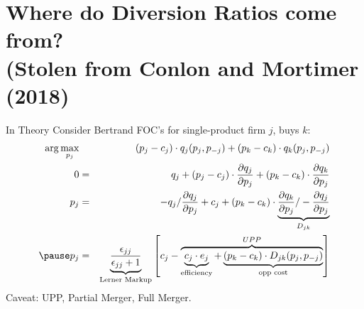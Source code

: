 \documentclass[xcolor=pdftex,dvipsnames,table,mathserif]{beamer}
\begin{document}

\section{Where do Diversion Ratios come from?\\ (Stolen from Conlon and Mortimer (2018)}
\begin{frame}{In Theory}
Consider Bertrand FOC's for single-product firm $j$, buys $k$:
\begin{eqnarray*}
\arg \max_{p_j}&&\, (p_j-c_j) \cdot q_j(p_j,p_{-j}) + (p_k-c_k) \cdot q_k(p_j,p_{-j})\\
0 &=&q_j+ (p_j-c_j) \cdot \frac{\partial q_j}{\partial p_j}+ (p_k-c_k) \cdot  \frac{\partial q_k}{\partial p_j}\\
p_j &=&-q_j/\frac{\partial q_j}{\partial p_j}+ c_j + (p_k-c_k) \cdot  \underbrace{\frac{\partial q_k}{\partial p_j}/-\frac{\partial q_j}{\partial p_j}}_{D_{jk}}\\ \pause
p_j &=& \underbrace{\frac{\epsilon_{jj}}{\epsilon_{jj}+1}}_{\text{Lerner Markup}} \left[  c_j -\overbrace{ \underbrace{c_j \cdot e_j}_{\text{efficiency}} + \underbrace{(p_k-c_k) \cdot  D_{jk} (p_j,p_{-j})}_{\text{opp cost}}}^{UPP} \right]\\
\end{eqnarray*}
Caveat: UPP, Partial Merger, Full Merger.
\end{frame}
\end{document}
